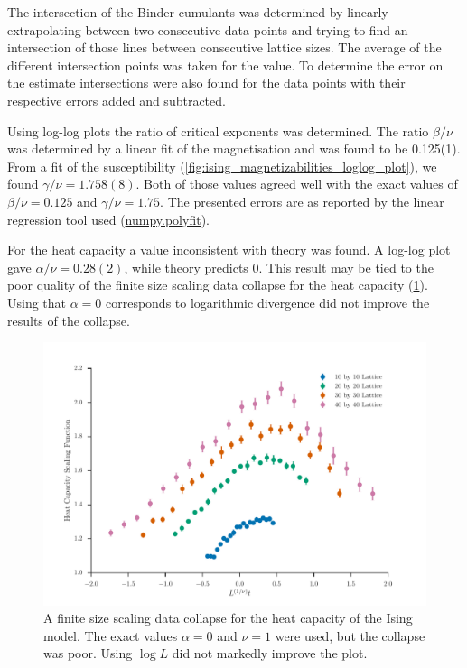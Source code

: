 \documentclass[11pt, a4paper]{report} %
\begin{document}
The intersection of the Binder cumulants was determined by linearly extrapolating between two consecutive data points and trying to find an intersection of those lines between consecutive lattice sizes.
The average of the different intersection points was taken for the value.
To determine the error on the estimate intersections were also found for the data points with their respective errors added and subtracted.

Using log-log plots the ratio of critical exponents was determined.
The ratio \(\beta/\nu\) was determined by a linear fit of the magnetisation and was found to be 0.125(1).
From a fit of the susceptibility (\cref{fig:ising_magnetizabilities_loglog_plot}), we found \(\gamma/\nu = 1.758(8)\).
Both of those values agreed well with the exact values of \(\beta/\nu = 0.125\) and \(\gamma/\nu = 1.75\).
The presented errors are as reported by the linear regression tool used (\url{numpy.polyfit}).

For the heat capacity a value inconsistent with theory was found.
A log-log plot gave \(\alpha /\nu = 0.28(2)\), while theory predicts 0.
This result may be tied to the poor quality of the finite size scaling data collapse for the heat capacity (\cref{fig:ising_heat_capacity_collapse}).
Using that \(\alpha=0\) corresponds to logarithmic divergence did not improve the results of the collapse.

\begin{figure}[htb]
	\includegraphics[width=\linewidth]{ising_heat_capacity_data_collapse.pdf}
	\caption{A finite size scaling data collapse for the heat capacity of the Ising model. The exact values \(\alpha=0\) and \(\nu=1\) were used, but the collapse was poor. Using \(\log{L}\) did not markedly improve the plot.}
	\label{fig:ising_heat_capacity_collapse}
\end{figure}
\end{document}

